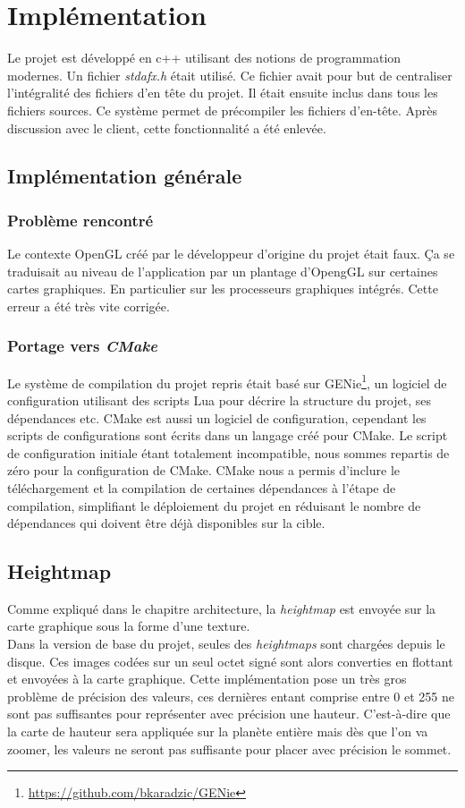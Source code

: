\chapter{Implémentation}
    Le projet est développé en c++ utilisant des notions de programmation modernes.
    Un fichier \textit{stdafx.h} était utilisé. Ce fichier avait pour but de centraliser l'intégralité des fichiers d'en tête du projet. Il était ensuite inclus dans tous les fichiers sources. Ce système permet de précompiler les fichiers d'en-tête. Après discussion avec le client, cette fonctionnalité a été enlevée.

    \section{Implémentation générale}
    \subsection{Problème rencontré}
    Le contexte OpenGL créé par le développeur d'origine du projet était faux. Ça se traduisait au niveau
    de l'application par un plantage d'OpengGL sur certaines cartes graphiques. En particulier sur les processeurs graphiques intégrés. Cette erreur a été très vite corrigée.
   
    \subsection{Portage vers \textit{CMake}}
    Le système de compilation du projet repris était basé sur GENie\footnote{\url{https://github.com/bkaradzic/GENie}}, un
    logiciel de configuration utilisant des scripts Lua pour décrire la
    structure du projet, ses dépendances etc. CMake est aussi un logiciel de
    configuration, cependant les scripts de configurations sont écrits dans
    un langage créé pour CMake. Le script de configuration initiale étant
    totalement incompatible, nous sommes repartis de zéro pour la
    configuration de CMake. CMake nous a permis d'inclure le téléchargement
    et la compilation de certaines dépendances à l'étape de compilation,
    simplifiant le déploiement du projet en réduisant le nombre de
    dépendances qui doivent être déjà disponibles sur la cible.
    
    \section{Heightmap}
    Comme expliqué dans le chapitre architecture, la \emph{heightmap} est envoyée sur la carte graphique sous la forme
    d'une texture.\\
    Dans la version de base du projet, seules des \emph{heightmaps} sont chargées depuis le disque. Ces images codées sur un
    seul octet signé sont alors converties en flottant et envoyées à la carte graphique. Cette implémentation pose un très gros problème de précision des valeurs, ces dernières entant comprise entre 0 et 255 ne sont pas suffisantes pour représenter
    avec précision une hauteur. C'est-à-dire que la carte de hauteur sera appliquée sur la planète entière mais dès que l'on va zoomer, les valeurs ne seront pas suffisante pour placer avec précision le sommet.
    
